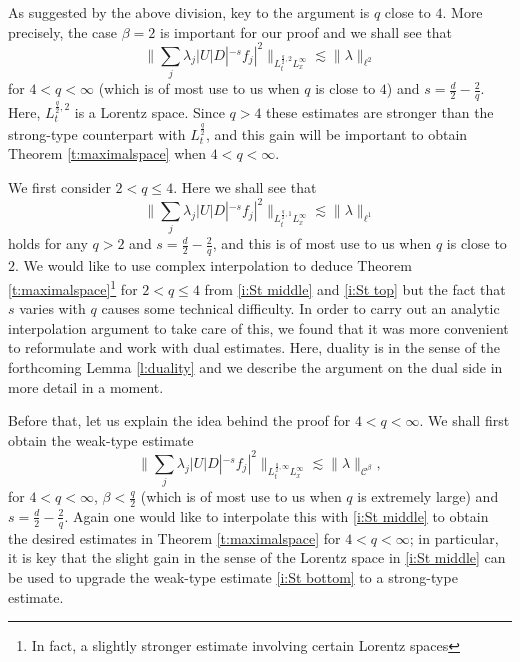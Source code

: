 \documentclass[a4paper]{amsart}
\numberwithin{equation}{section}%
\theoremstyle{plain}%
\theoremstyle{definition}
\theoremstyle{remark}%
\def\C{\mathcal{C}}
\def\C{\mathcal{C}}
\begin{document}
As suggested by the above division, key to the argument is $q$ close to $4$. More precisely, the case $\beta = 2$ is important for our proof and we shall see that
\begin{equation}\label{i:St middle}
    \bigg\|\sum_j\lambda_j|U|D|^{-s}f_j|^2 \bigg\|_{L_t^{\frac q2,2}L_x^\infty}
    \lesssim
    \|\lambda\|_{\ell^2}
\end{equation}
for $4 < q < \infty$ (which is of most use to us when $q$ is close to $4$) and $s = \frac{d}{2} - \frac{2}{q}$. Here, $L_t^{\frac q2,2}$ is a Lorentz space. Since $q > 4$ these estimates are stronger than the strong-type counterpart with $L_t^{\frac q2}$, and this gain will be important to obtain Theorem \ref{t:maximalspace} when $4 < q < \infty$. 

We first consider $2<q\leq 4$. Here we shall see that \begin{equation}\label{i:St top}
    \bigg\|\sum_j\lambda_j|U|D|^{-s}f_j|^2 \bigg\|_{L_t^{\frac q2,1}L_x^\infty}
    \lesssim
    \|\lambda\|_{\ell^1}
\end{equation}
holds for any $q>2$ and $s = \frac{d}{2} - \frac{2}{q}$, and this is of most use to us when $q$ is close to $2$. We would like to use complex interpolation to deduce Theorem \ref{t:maximalspace}\footnote{In fact, a slightly stronger estimate involving certain Lorentz spaces} for $2 < q \leq 4$ from \eqref{i:St middle} and \eqref{i:St top} but the fact that $s$ varies with $q$ causes some technical difficulty. In order to carry out an analytic interpolation argument to take care of this, we found that it was more convenient to reformulate and work with dual estimates. Here, duality is in the sense of the forthcoming Lemma \ref{l:duality} and we describe the argument on the dual side in more detail in a moment.

Before that, let us explain the idea behind the proof for $4 < q < \infty$. We shall first obtain the weak-type estimate
\begin{equation}\label{i:St bottom}
    \bigg\|\sum_j\lambda_j|U|D|^{-s}f_j|^2 \bigg\|_{L_t^{\frac q2,\infty}L_x^\infty}
    \lesssim
    \|\lambda\|_{\C^{\beta}},
\end{equation}
for $4 < q < \infty$, $\beta<\frac{q}{2}$ (which is of most use to us when $q$ is extremely large) and $s = \frac{d}{2} - \frac{2}{q}$. Again one would like to interpolate this with \eqref{i:St middle} to obtain the desired estimates in Theorem \ref{t:maximalspace} for $4 < q < \infty$; in particular, it is key that the slight gain in the sense of the Lorentz space in \eqref{i:St middle} can be used to upgrade the weak-type estimate \eqref{i:St bottom} to a strong-type estimate.
\end{document}
